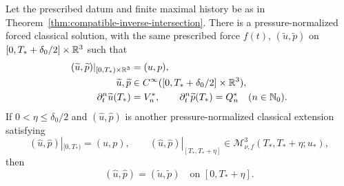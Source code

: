\begin{theorem}
\label{thm:ier-same-history-restart}
Let the prescribed datum and finite maximal history be as in
Theorem~\ref{thm:compatible-inverse-intersection}.
There is a pressure-normalized forced classical solution, with the same
prescribed force \(f(t)\),
\((\widetilde u,\widetilde p)\) on
\([0,T_*+\delta_0/2]\times\mathbb R^3\) such that
\begin{align}
 (\widetilde u,\widetilde p)|_{[0,T_*)\times\mathbb R^3}
 &=(u,p),
 \label{eq:ier-extension-identity}\\
 \widetilde u,\widetilde p
 &\in C^\infty([0,T_*+\delta_0/2]\times\mathbb R^3),
 \label{eq:ier-extension-smoothness}\\
 \partial_t^n\widetilde u(T_*)&=V_n^*,
 \qquad
 \partial_t^n\widetilde p(T_*)=Q_n^*
 \quad(n\in\mathbb N_0).
 \label{eq:ier-extension-jet}
\end{align}
If \(0<\eta\le\delta_0/2\) and
\((\widehat u,\widehat p)\) is another pressure-normalized classical
extension satisfying
\begin{equation}
 (\widehat u,\widehat p)|_{[0,T_*)}=(u,p),
 \qquad
 (\widehat u,\widehat p)|_{[T_*,T_*+\eta]}
 \in\mathscr M_{\nu,f}^3(T_*,T_*+\eta;u_*),
 \label{eq:ier-same-history-uniqueness-class}
\end{equation}
then
\begin{equation}
 (\widehat u,\widehat p)=(\widetilde u,\widetilde p)
 \quad\text{on }[0,T_*+\eta].
 \label{eq:ier-same-history-uniqueness}
\end{equation}
\end{theorem}

